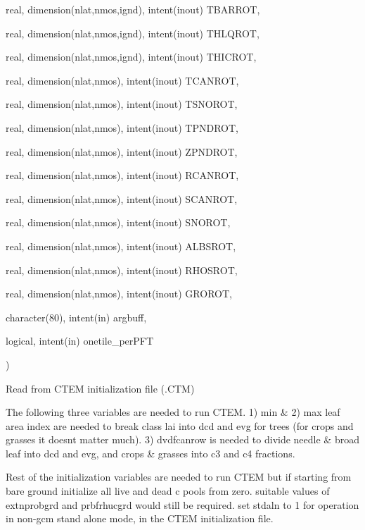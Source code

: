 {\begin{DoxyParamCaption}
\item[{real, dimension(nlat,nmos,ignd), intent(inout)}]{T\+B\+A\+R\+R\+O\+T, }
\item[{real, dimension(nlat,nmos,ignd), intent(inout)}]{T\+H\+L\+Q\+R\+O\+T, }
\item[{real, dimension(nlat,nmos,ignd), intent(inout)}]{T\+H\+I\+C\+R\+O\+T, }
\item[{real, dimension(nlat,nmos), intent(inout)}]{T\+C\+A\+N\+R\+O\+T, }
\item[{real, dimension(nlat,nmos), intent(inout)}]{T\+S\+N\+O\+R\+O\+T, }
\item[{real, dimension(nlat,nmos), intent(inout)}]{T\+P\+N\+D\+R\+O\+T, }
\item[{real, dimension(nlat,nmos), intent(inout)}]{Z\+P\+N\+D\+R\+O\+T, }
\item[{real, dimension(nlat,nmos), intent(inout)}]{R\+C\+A\+N\+R\+O\+T, }
\item[{real, dimension(nlat,nmos), intent(inout)}]{S\+C\+A\+N\+R\+O\+T, }
\item[{real, dimension(nlat,nmos), intent(inout)}]{S\+N\+O\+R\+O\+T, }
\item[{real, dimension(nlat,nmos), intent(inout)}]{A\+L\+B\+S\+R\+O\+T, }
\item[{real, dimension(nlat,nmos), intent(inout)}]{R\+H\+O\+S\+R\+O\+T, }
\item[{real, dimension(nlat,nmos), intent(inout)}]{G\+R\+O\+R\+O\+T, }
\item[{character(80), intent(in)}]{argbuff, }
\item[{logical, intent(in)}]{onetile\+\_\+per\+P\+F\+T}
\end{DoxyParamCaption}
)}\label{group__io__driver__read__from__ctm_ga754f9c8c8e4e916e436474006963eae9}
Read from C\+T\+E\+M initialization file (.C\+T\+M)

The following three variables are needed to run C\+T\+E\+M. 1) min \& 2) max leaf area index are needed to break class lai into dcd and evg for trees (for crops and grasses it doesn\textquotesingle{}t matter much). 3) dvdfcanrow is needed to divide needle \& broad leaf into dcd and evg, and crops \& grasses into c3 and c4 fractions.

Rest of the initialization variables are needed to run C\+T\+E\+M but if starting from bare ground initialize all live and dead c pools from zero. suitable values of extnprobgrd and prbfrhucgrd would still be required. set stdaln to 1 for operation in non-\/gcm stand alone mode, in the C\+T\+E\+M initialization file.

